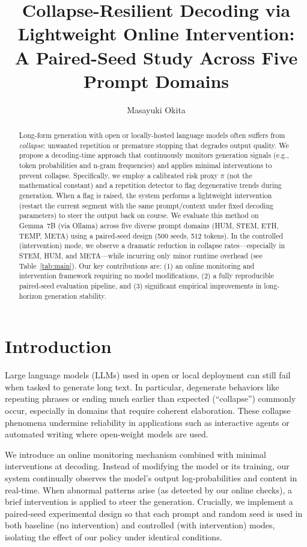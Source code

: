 \documentclass{article}
\begin{document}
\title{Collapse-Resilient Decoding via Lightweight Online Intervention:\\A Paired-Seed Study Across Five Prompt Domains}
\author{Masayuki Okita}
\date{}
\maketitle

\begin{abstract}
Long-form generation with open or locally-hosted language models often suffers from \emph{collapse}: unwanted repetition or premature stopping that degrades output quality. We propose a decoding-time approach that continuously monitors generation signals (e.g., token probabilities and n-gram frequencies) and applies minimal interventions to prevent collapse. Specifically, we employ a calibrated risk proxy $\pi$ (not the mathematical constant) and a repetition detector to flag degenerative trends during generation. When a flag is raised, the system performs a lightweight intervention (restart the current segment with the same prompt/context under fixed decoding parameters) to steer the output back on course. We evaluate this method on Gemma~7B (via Ollama) across five diverse prompt domains (HUM, STEM, ETH, TEMP, META) using a paired-seed design (500 seeds, 512 tokens). In the controlled (intervention) mode, we observe a dramatic reduction in collapse rates---especially in STEM, HUM, and META---while incurring only minor runtime overhead (see Table~\ref{tab:main}). Our key contributions are: (1) an online monitoring and intervention framework requiring no model modifications, (2) a fully reproducible paired-seed evaluation pipeline, and (3) significant empirical improvements in long-horizon generation stability.
\end{abstract}

\section{Introduction}
Large language models (LLMs) used in open or local deployment can still fail when tasked to generate long text. In particular, degenerate behaviors like repeating phrases or ending much earlier than expected (``collapse'') commonly occur, especially in domains that require coherent elaboration. These collapse phenomena undermine reliability in applications such as interactive agents or automated writing where open-weight models are used.

We introduce an online monitoring mechanism combined with minimal interventions at decoding. Instead of modifying the model or its training, our system continually observes the model's output log-probabilities and content in real-time. When abnormal patterns arise (as detected by our online checks), a brief intervention is applied to steer the generation. Crucially, we implement a paired-seed experimental design so that each prompt and random seed is used in both baseline (no intervention) and controlled (with intervention) modes, isolating the effect of our policy under identical conditions.
\end{document}
